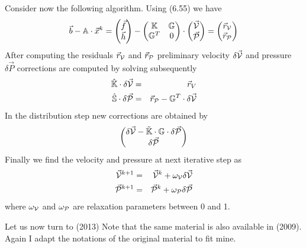 Consider now the following algorithm. Using (6.55) we have
\[
\vec{b} - \mathbb{A} \cdot \vec{x}^k = 
\begin{pmatrix}
\vec{f} \\ \vec{h} 
\end{pmatrix}
-
\begin{pmatrix}
{\mathbb{K}} & {\mathbb{G}} \\
{\mathbb{G}}^T & 0
\end{pmatrix}
\cdot
\begin{pmatrix}
\vec{\cal V} \\ 
\vec{\cal P}
\end{pmatrix}
= 
\begin{pmatrix}
\vec{r}_{\cal V} \\
\vec{r}_{\cal P}
\end{pmatrix}
\]
After computing the residuals $\vec{r}_{\cal V}$ and $\vec{r}_{\cal P}$ preliminary 
velocity $\delta \vec{\cal V}$ and pressure $\delta \vec{P}$ corrections 
are computed by solving subsequently
\begin{eqnarray}
\hat{\mathbb{K}}\cdot\delta \vec{\cal V} &=& \vec{r}_V \nonumber\\
\hat{\mathbb{S}}\cdot\delta \vec{\cal P} &=&\vec{r}_{\cal P} - {\mathbb{G}}^T \cdot \delta \vec{\cal V} \nonumber
\end{eqnarray}
In the distribution step new corrections are obtained by
\[
\begin{pmatrix}
\delta \vec{\cal V} -\tilde{{\mathbb{K}}} \cdot {\mathbb{G}} \cdot \delta \vec{\cal P} \\
\delta \vec{\cal P}
\end{pmatrix}
\]
Finally we find the velocity and pressure at next iterative step as
\begin{eqnarray}
\vec{\cal V}^{k+1} &=& \vec{\cal V}^{k} + \omega_{\cal V} \delta \vec{\cal V} \nonumber\\
\vec{\cal P}^{k+1} &=& \vec{\cal P}^{k} + \omega_{\cal P} \delta \vec{\cal P}
\end{eqnarray}
where $\omega_{\cal V}$ and $\omega_{\cal P}$ are relaxation parameters 
between 0 and 1.

\newpage
Let us now turn to \textcite{eche13} (2013)
Note that the same material is also available in \textcite{urvs09} (2009).
Again I adapt the notations of the original material to fit mine.

